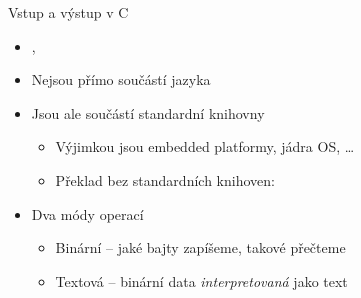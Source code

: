 \begin{frame}{Vstup a výstup v C}

  \begin{itemize}
    \item {}, 

    \pause

    \item Nejsou přímo součástí jazyka

    \pause

    \item Jsou ale součástí standardní knihovny
    \begin{itemize}
      \item Výjimkou jsou embedded platformy, jádra OS, \dots
      \item Překlad bez standardních knihoven: 
    \end{itemize}

    \pause

    \item Dva módy operací
    \begin{itemize}
      \item Binární -- jaké bajty zapíšeme, takové přečteme

      \pause

      \item Textová -- binární data \emph{interpretovaná} jako text
    \end{itemize}

  \end{itemize}

\end{frame}

